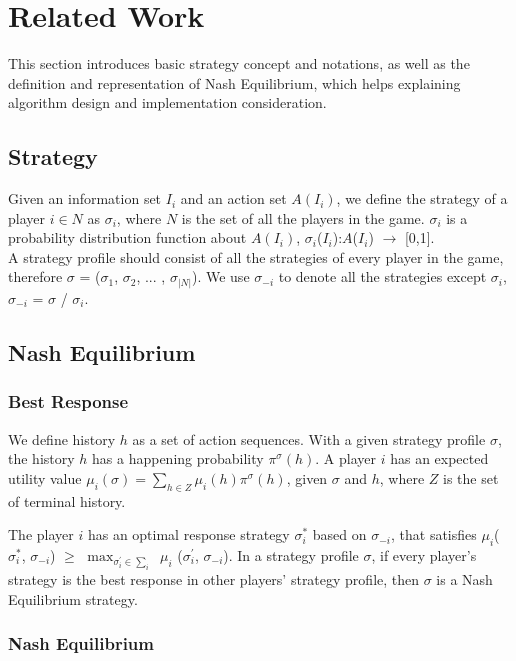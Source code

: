 \documentclass{article}
\begin{document}
\section{Related Work}

This section introduces basic strategy concept and notations, as well as the definition and representation of Nash Equilibrium, which helps explaining algorithm design and implementation consideration. 

\subsection{Strategy}

Given an information set $I_i$ and an action set $A(I_i)$, we define the strategy of a player $i \in N$ as $\sigma_i$, where $N$ is the set of all the players in the game. $\sigma_i$ is a probability distribution function about $A(I_i)$, $\sigma_i$($I_i$):$A$($I_i$) $\rightarrow$ [0,1].\\
A strategy profile should consist of all the strategies of every player in the game, therefore $\sigma$ = ($\sigma_1$, $\sigma_2$, ... , $\sigma_{|N|}$). We use $\sigma_{-i}$ to denote all the strategies except $\sigma_i$, $\sigma_{-i}$ = $\sigma$ / {$\sigma_i$}.

\subsection{Nash Equilibrium}

\subsubsection{Best Response}

We define history $h$ as a set of action sequences. With a given strategy profile $\sigma$, the history $h$ has a happening probability $\pi^{\sigma}(h)$.  A player $i$ has an expected utility value
$\mu_i(\sigma) = \sum_{h \in Z} \mu_i(h) \pi^{\sigma}(h)$, given $\sigma$ and $h$, where $Z$ is the set of terminal history.

The player $i$ has an optimal response strategy $\sigma_i^*$ based on $\sigma_{-i}$, that satisfies $\mu_i$($\sigma_i^*$, $\sigma_{-i}$) $\geq$ $\max_{\sigma_i^{\prime} \in \sum_i}$ $\mu_i$ ($\sigma_i^\prime$, $\sigma_{-i}$). In a strategy profile $\sigma$, if every player's strategy is the best response in other players' strategy profile, then $\sigma$ is a Nash Equilibrium strategy.

\subsubsection{Nash Equilibrium}
\end{document}
